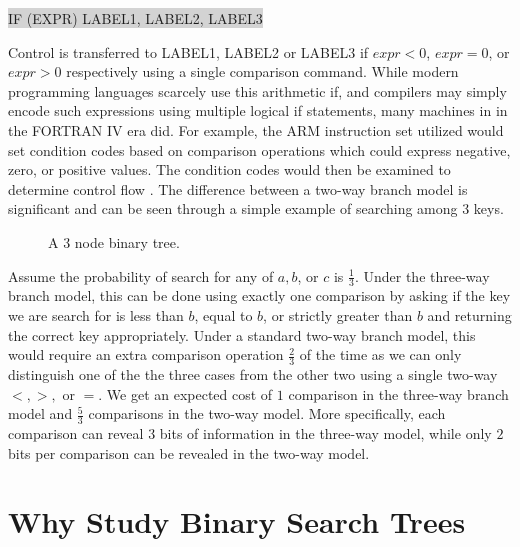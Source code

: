 \documentclass[letterpaper,12pt,titlepage,oneside,final]{book}
\theoremstyle{plain}
\begin{document}
\colorbox{lightgrey}{ \selectfont \uppercase{IF (expr) label1, label2, label3} } 
 
\noindent Control is transferred to \uppercase{label1}, \uppercase{label2} or \uppercase{label3} if $expr < 0$, $expr=0$, or $expr > 0$ respectively using a single comparison command. While modern programming languages scarcely use this arithmetic if, and compilers may simply encode such expressions using multiple logical if statements, many machines in in the FORTRAN IV era did. For example, the ARM instruction set utilized would set condition codes based on comparison operations which could express negative, zero, or positive values. The condition codes would then be examined to determine control flow \cite{ARM}. The difference between a two-way branch model is significant and can be seen through a simple example of searching among 3 keys.

\begin{figure}[!ht]
\begin{center}

\caption{A 3 node binary tree.}

\end{center}
\end{figure}

Assume the probability of search for any of $a,b$, or $c$ is $\frac{1}{3}$. Under the three-way branch model, this can be done using exactly one comparison by asking if the key we are search for is less than $b$, equal to $b$, or strictly greater than $b$ and returning the correct key appropriately. Under a standard two-way branch model, this would require an extra comparison operation $\frac{2}{3}$ of the time as we can only distinguish one of the the three cases from the other two using a single two-way $<, >,$ or $=$. We get an expected cost of $1$ comparison in the three-way branch model and $\frac{5}{3}$ comparisons in the two-way model. More specifically, each comparison can reveal $3$ bits of information in the three-way model, while only $2$ bits per comparison can be revealed in the two-way model. 

\section{Why Study Binary Search Trees}
\end{document}

